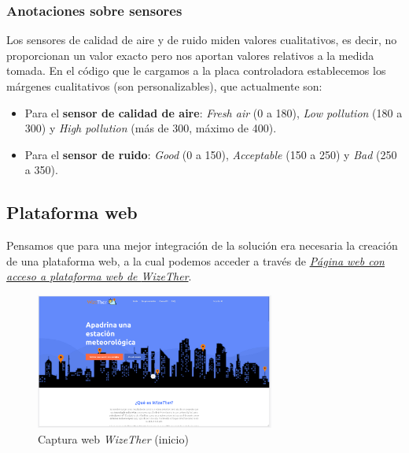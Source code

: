 \documentclass[12pt]{article}
\begin{document}
\pagebreak

\subsubsection{Anotaciones sobre sensores}

Los sensores de calidad de aire y de ruido miden valores cualitativos, es decir, no proporcionan un valor exacto pero nos aportan valores relativos a la medida tomada. En el código que le cargamos a la placa controladora establecemos los márgenes cualitativos (son personalizables), que actualmente son:

\begin{itemize}
	\item Para el \textbf{sensor de calidad de aire}: \textit{Fresh air} (0 a 180), \textit{Low pollution} (180 a 300) y \textit{High pollution} (más de 300, máximo de 400).
	\item Para el \textbf{sensor de ruido}: \textit{Good} (0 a 150),  \textit{Acceptable} (150 a 250) y \textit{Bad} (250 a 350).
\end{itemize}

\subsection{Plataforma web}
Pensamos que para una mejor integración de la solución era necesaria la creación de una plataforma web, a la cual podemos acceder a través de \href{https://wizether.ranii.pro/}{\textit{Página web con acceso a plataforma web de \textit{WizeTher}}}. \\

\begin{figure}[h]
	\begin{center}
		\includegraphics[width=0.7\textwidth]{img_rani/web_home.png}
		\caption{Captura web \textit{WizeTher} (inicio)}
	\end{center}
\end{figure}
\end{document}
